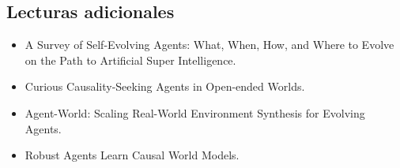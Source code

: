 \documentclass[a4paper]{article}
\begin{document}
\subsection{Lecturas adicionales}

\begin{itemize}
    \item A Survey of Self-Evolving Agents: What, When, How, and Where to Evolve on the Path to Artificial Super Intelligence.
    \item Curious Causality-Seeking Agents in Open-ended Worlds.
    \item Agent-World: Scaling Real-World Environment Synthesis for Evolving Agents.
    \item Robust Agents Learn Causal World Models.
\end{itemize}
\end{document}
